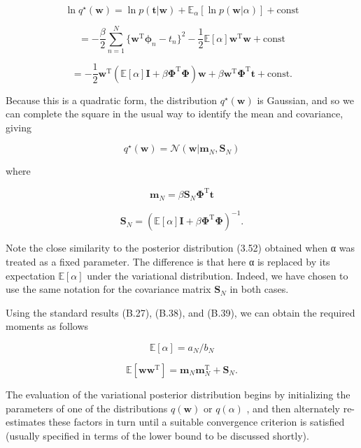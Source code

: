\documentclass[
  10
]{article}
\begin{document}
\[
\ln q ^ {\star} (\mathbf {w}) = \ln p (\mathbf {t} | \mathbf {w}) + \mathbb {E} _ {\alpha} [ \ln p (\mathbf {w} | \alpha) ] + \mathrm{const}\tag{10.96}
\]

\[
{ = } { - \frac { \beta } { 2 } \sum _ { n = 1 } ^ { N } \{ \mathbf { w } ^ { \mathrm{T} } \boldsymbol { \phi } _ { n } - t _ { n } \} ^ { 2 } - \frac { 1 } { 2 } \mathbb { E } [ \alpha ] \mathbf { w } ^ { \mathrm{T} } \mathbf { w } + \mathrm{const} }\tag{10.97}
\]

\[
{ = } { - \frac { 1 } { 2 } \mathbf { w } ^ { \mathrm{T} } \left( \mathbb { E } [ \alpha ] \mathbf { I } + \beta \pmb { \Phi } ^ { \mathrm{T} } \pmb { \Phi } \right) \mathbf { w } + \beta \mathbf { w } ^ { \mathrm{T} } \pmb { \Phi } ^ { \mathrm{T} } \mathbf { t } + \mathrm{const.} }\tag{10.98}
\]

Because this is a quadratic form, the distribution
\(q ^ { \star } ( \mathbf { w } )\) is Gaussian, and so we can complete
the square in the usual way to identify the mean and covariance, giving

\[
q ^ {\star} (\mathbf {w}) = \mathcal {N} (\mathbf {w} | \mathbf {m} _ {N}, \mathbf {S} _ {N})\tag{10.99}
\]

where

\[
{\mathbf m} _ {N} = \beta {\mathbf S} _ {N} {\mathbf \Phi} ^ {\mathrm{T}} {\mathbf t}\tag{10.100}
\]

\[
\mathbf {S} _ {N} = \left(\mathbb {E} [ \alpha ] \mathbf {I} + \beta \boldsymbol {\Phi} ^ {\mathrm{T}} \boldsymbol {\Phi}\right) ^ {- 1}.\tag{10.101}
\]

Note the close similarity to the posterior distribution (3.52) obtained
when α was treated as a fixed parameter. The difference is that here α
is replaced by its expectation \(\mathbb { E } [ \alpha ]\) under the
variational distribution. Indeed, we have chosen to use the same
notation for the covariance matrix \(\mathbf { S } _ { N }\) in both
cases.

Using the standard results (B.27), (B.38), and (B.39), we can obtain the
required moments as follows

\[
\mathbb {E} [ \alpha ] = a _ {N} / b _ {N}\tag{10.102}
\]

\[
{\mathbb {E} [ \mathbf {w w} ^ {\mathrm{T}} ]} = {\mathbf {m} _ {N} \mathbf {m} _ {N} ^ {\mathrm{T}} + \mathbf {S} _ {N}.}\tag{10.103}
\]

The evaluation of the variational posterior distribution begins by
initializing the parameters of one of the distributions
\(q ( \mathbf { w } )\) or \(q ( \alpha )\) , and then alternately
re-estimates these factors in turn until a suitable convergence
criterion is satisfied (usually specified in terms of the lower bound to
be discussed shortly).
\end{document}
